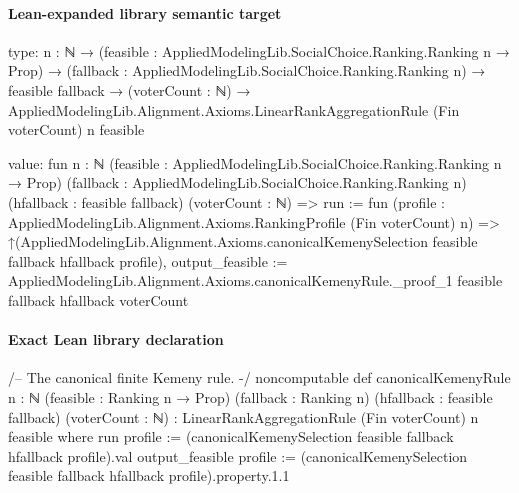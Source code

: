 \documentclass[10pt]{article}
\begin{document}
\paragraph{Lean-expanded library semantic target}
\begin{ReviewVerbatim}
type:
{n : ℕ} →
  (feasible : AppliedModelingLib.SocialChoice.Ranking.Ranking n → Prop) →
    (fallback : AppliedModelingLib.SocialChoice.Ranking.Ranking n) →
      feasible fallback →
        (voterCount : ℕ) → AppliedModelingLib.Alignment.Axioms.LinearRankAggregationRule (Fin voterCount) n feasible

value:
fun {n : ℕ} (feasible : AppliedModelingLib.SocialChoice.Ranking.Ranking n → Prop)
    (fallback : AppliedModelingLib.SocialChoice.Ranking.Ranking n) (hfallback : feasible fallback) (voterCount : ℕ) =>
  {
    run := fun (profile : AppliedModelingLib.Alignment.Axioms.RankingProfile (Fin voterCount) n) =>
      ↑(AppliedModelingLib.Alignment.Axioms.canonicalKemenySelection feasible fallback hfallback profile),
    output_feasible :=
      AppliedModelingLib.Alignment.Axioms.canonicalKemenyRule._proof_1 feasible fallback hfallback voterCount }
\end{ReviewVerbatim}

\paragraph{Exact Lean library declaration}
\begin{ReviewVerbatim}
/-- The canonical finite Kemeny rule. -/
noncomputable def canonicalKemenyRule {n : ℕ}
    (feasible : Ranking n → Prop) (fallback : Ranking n) (hfallback : feasible fallback)
    (voterCount : ℕ) : LinearRankAggregationRule (Fin voterCount) n feasible where
  run profile := (canonicalKemenySelection feasible fallback hfallback profile).val
  output_feasible profile :=
    (canonicalKemenySelection feasible fallback hfallback profile).property.1.1
\end{ReviewVerbatim}
\end{document}
